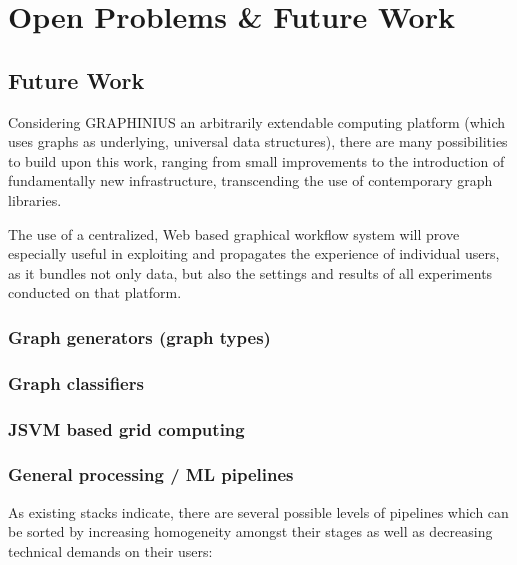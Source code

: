 \chapter{Open Problems \& Future Work}
\label{ch:future_work}



\section{Future Work}
\label{sect:future_challenges}

Considering GRAPHINIUS an arbitrarily extendable computing platform (which uses graphs as underlying, universal data structures), there are many possibilities to build upon this work, ranging from small improvements to the introduction of fundamentally new infrastructure, transcending the use of contemporary graph libraries. 

The use of a centralized, Web based graphical workflow system will prove especially useful in exploiting and propagates the experience of individual users, as it bundles not only data, but also the settings and results of all experiments conducted on that platform.


\subsection{Graph generators (graph types)}
\label{ssect:graph_gen}


\subsection{Graph classifiers}
\label{ssect:graph_class}


\subsection{JSVM based grid computing}
\label{ssect:jsvm_grid}


\subsection{General processing / ML pipelines}
\label{ssect:pipelines}

As existing stacks indicate, there are several possible levels of pipelines which can be sorted by increasing homogeneity amongst their stages as well as decreasing technical demands on their users:

